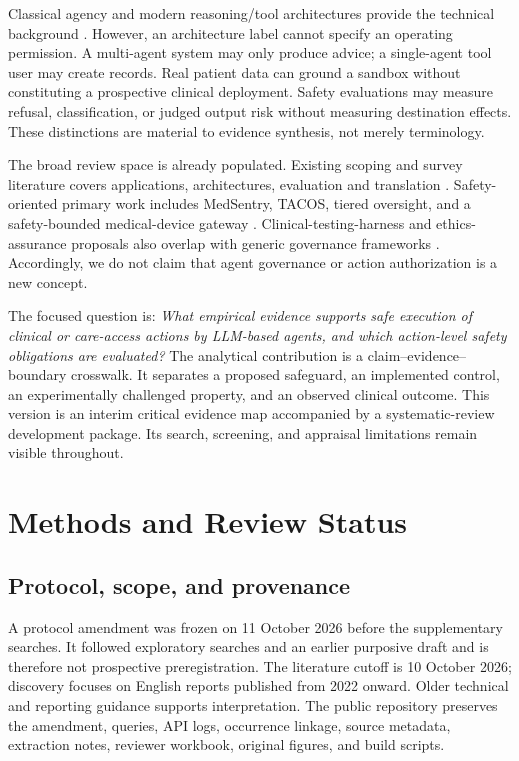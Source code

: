 \documentclass[journal,10pt]{IEEEtran}
\begin{document}
Classical agency and modern reasoning/tool architectures provide the technical background \cite{wooldridge1995,react2023,toolformer2023,rag2020,reflexion2023}. However, an architecture label cannot specify an operating permission. A multi-agent system may only produce advice; a single-agent tool user may create records. Real patient data can ground a sandbox without constituting a prospective clinical deployment. Safety evaluations may measure refusal, classification, or judged output risk without measuring destination effects. These distinctions are material to evidence synthesis, not merely terminology.

The broad review space is already populated. Existing scoping and survey literature covers applications, architectures, evaluation and translation \cite{collaco2026review,xu2026survey,vatsal2026taxonomy,hu2026survey,broadscoping}. Safety-oriented primary work includes MedSentry, TACOS, tiered oversight, and a safety-bounded medical-device gateway \cite{medsentry,tacos,tieredoversight,sdcgateway}. Clinical-testing-harness and ethics-assurance proposals also overlap with generic governance frameworks \cite{clinicalharness,voiceassurance}. Accordingly, we do not claim that agent governance or action authorization is a new concept.

The focused question is: \emph{What empirical evidence supports safe execution of clinical or care-access actions by LLM-based agents, and which action-level safety obligations are evaluated?} The analytical contribution is a claim--evidence--boundary crosswalk. It separates a proposed safeguard, an implemented control, an experimentally challenged property, and an observed clinical outcome. This version is an interim critical evidence map accompanied by a systematic-review development package. Its search, screening, and appraisal limitations remain visible throughout.

\section{Methods and Review Status}
\subsection{Protocol, scope, and provenance}
A protocol amendment was frozen on 11 October 2026 before the supplementary searches. It followed exploratory searches and an earlier purposive draft and is therefore not prospective preregistration. The literature cutoff is 10 October 2026; discovery focuses on English reports published from 2022 onward. Older technical and reporting guidance supports interpretation. The public repository preserves the amendment, queries, API logs, occurrence linkage, source metadata, extraction notes, reviewer workbook, original figures, and build scripts.
\end{document}
